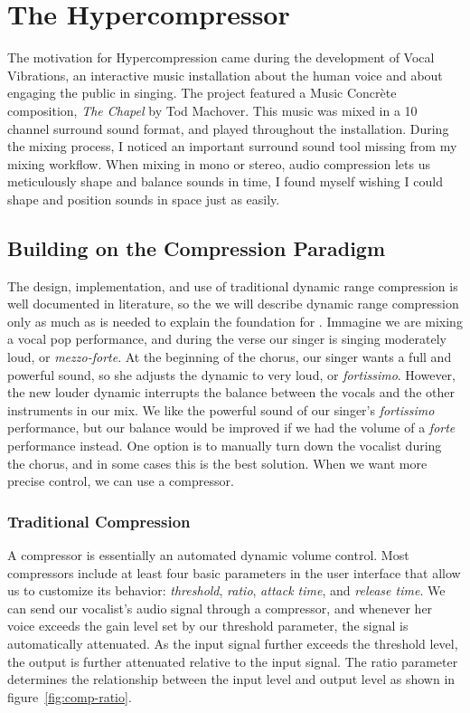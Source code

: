 \chapter{The Hypercompressor}
\label{ch:hypercompressor}

The motivation for Hypercompression came during the development of
Vocal Vibrations, an interactive music installation about the human
voice and about engaging the public in singing.\cite{Holbrow2014} The
project featured a Music Concr\`{e}te composition, \textit{The Chapel}
by Tod Machover. This music was mixed in a 10 channel surround sound
format, and played throughout the installation. During the mixing
process, I noticed an important surround sound tool missing from my
mixing workflow. When mixing in mono or stereo, audio
compression lets us meticulously shape and balance sounds in
time, I found myself wishing I could shape and position sounds in
space just as easily.

\section{Building on the Compression Paradigm}
The design, implementation, and use of traditional dynamic range
compression is well documented in
literature,\cite[]{Giannoulis2012,Case2007,Deruty2014} so the we will
describe dynamic range compression only as much as is needed to
explain the foundation for \thesis. Immagine we are mixing a vocal pop
performance, and during the verse our singer is singing moderately
loud, or \textit{mezzo-forte}. At the beginning of the chorus, our
singer wants a full and powerful sound, so she adjusts the dynamic to
very loud, or \textit{fortissimo}. However, the new louder dynamic
interrupts the balance between the vocals and the other instruments in
our mix. We like the powerful sound of our singer's
\textit{fortissimo} performance, but our balance would be improved if
we had the volume of a \textit{forte} performance instead. One option
is to manually turn down the vocalist during the chorus, and in some
cases this is the best solution. When we want more precise control, we
can use a compressor.

\subsection{Traditional Compression}
\label{sec:trad-compr}
A compressor is essentially an automated dynamic volume control.  Most
compressors include at least four basic parameters in the user
interface that allow us to customize its behavior: \textit{threshold},
\textit{ratio}, \textit{attack time}, and \textit{release time}.  We
can send our vocalist's audio signal through a compressor, and
whenever her voice exceeds the gain level set by our threshold
parameter, the signal is automatically attenuated. As the input signal
further exceeds the threshold level, the output is further attenuated
relative to the input signal. The ratio parameter determines the
relationship between the input level and output level as shown in
figure~\ref{fig:comp-ratio}.

